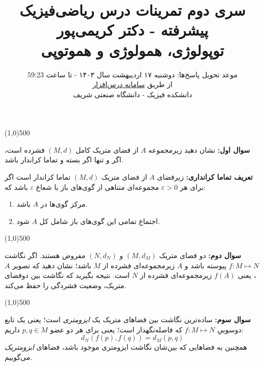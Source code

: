 \documentclass{article}
\title{ سری دوم تمرینات درس ریاضی‌فیزیک پیشرفته - دکتر کریمی‌پور
\\
\vspace{-1em}
توپولوژی، همولوژی و هموتوپی
}
\author{موعد تحویل پاسخ‌ها:
 دوشنبه ۱۷ اردیبهشت سال ۱۴۰۳ - تا ساعت 59:23
 \\
 از طریق 
 \href{https://cw.sharif.edu/}{سامانه درس‌افزار}
\\
دانشکده فیزیک - دانشگاه صنعتی شریف
}\date{}
\begin{document}
	\maketitle
	
	\def\endline{		{
			\vspace{-2.5em}
			\color{cyan}
			\begin{center} \linethickness{1mm}\line(1,0){500} \end{center}
	}}
\def\thinendline{		{
		\vspace{-2.5em}
		\color{purple}
		\begin{center} \linethickness{0.5mm}\line(1,0){500} \end{center}
}}
\vspace{-2em}
		\endline
		
		\noindent
		\textbf{سوال اول:}
		نشان دهید
	 زیرمجموعه $A$ از فضای متریک کامل $(M,d)$ فشرده است، اگر و تنها اگر بسته و تماما کراندار
	  باشد.
	 
	 \begin{mdframed}
	 	\textbf{تعریف تماما کرانداری:}
	 	زیرفضای $A$ از فضای متریک $(M,d)$ تماما کراندار است اگر برای هر 
	 	$\varepsilon>0$
	  مجموعه‌ای متناهی از گوی‌های باز با شعاع $\varepsilon$ باشد که:
	  \begin{enumerate}
	  	\itemsep-0.5em 
	  	\item مرکز گوی‌ها در $A$ باشد.
	  	\item اجتماع تمامی این گوی‌های باز شامل کل $A$ شود. 
	  \end{enumerate}
	 \end{mdframed}
		
		\vspace{-2em}
				\endline
		
		\noindent
		\textbf{سوال  دوم:}
		دو فضای متریک 
		$(M,d_M)$ 
		و
		$(N,d_N)$
		مفروض هستند.
		اگر نگاشت 
		$f: M \longmapsto N$
		پیوسته باشد و $A$ زیرمجموعه‌ای فشرده از $M$ باشد؛ نشان دهید که تصویر $A$، یعنی $f(A)$ زیرمجموعه‌ای فشرده از $N$ است. نتیجه بگیرید که نگاشت
		بین دوفضای متریک، وضعیت فشردگی را حفظ می‌کند.
		
		
				\endline
		
		\noindent
		\textbf{سوال سوم:}
		ساده‌ترین نگاشت بین فضاهای متریک یک 
		\textit{ایزومتری}
		است؛ یعنی یک تابع دوسوییِ
		$f: M \longmapsto N$ 
		که فاصله‌نگهدار است؛ یعنی برای هر دو عضو $p,q\in M$ داریم:
		\[
		d_N(f(p),f(q)) = d_M(p,q)
		\]
		همچنین به فضاهایی که بین‌شان نگاشت ایزومتری موجود باشد، فضاهای \textit{ایزومتریک} می‌گوییم.
		
\end{document}
